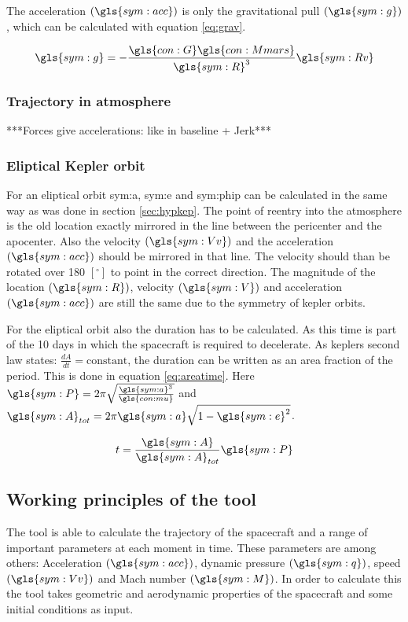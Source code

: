 The acceleration $\left(\gls{sym:acc}\right)$ is only the gravitational pull $\left(\gls{sym:g}\right)$, which can be calculated with equation \ref{eq:grav}.

\begin{equation} \label{eq:grav}
\gls{sym:g} = -\frac{\gls{con:G}\gls{con:Mmars}}
					{\gls{sym:R}^3}\gls{sym:Rv}
\end{equation}

\subsubsection{Trajectory in atmosphere}
 \label{sec:trajatmos}
***Forces give accelerations: like in baseline + Jerk***\\

\subsubsection{Eliptical Kepler orbit}
 \label{sec:eliptickep}
For an eliptical orbit \gls{sym:a}, \gls{sym:e} and \gls{sym:phip} can be calculated in the same way as was done in section \ref{sec:hypkep}. The point of reentry into the atmosphere is the old location exactly mirrored in the line between the pericenter and the apocenter. Also the velocity $\left(\gls{sym:Vv}\right)$ and the acceleration $\left(\gls{sym:acc}\right)$  should be mirrored in that line. The velocity should than be rotated over 180 $\left[^\circ\right]$ to point in the correct direction. The magnitude of the location $\left(\gls{sym:R}\right)$, velocity $\left(\gls{sym:V}\right)$ and acceleration $\left(\gls{sym:acc}\right)$ are still the same due to the symmetry of kepler orbits.

For the eliptical orbit also the duration has to be calculated. As this time is part of the 10 days in which the spacecraft is required to decelerate. As keplers second law states: $\frac{dA}{dt}=\mbox{constant}$, the duration can be written as an area fraction of the period. This is done in equation \ref{eq:areatime}. Here $\gls{sym:P} = 2\pi\sqrt{\frac{\gls{sym:a}^3}{\gls{con:mu}}}$ and $\gls{sym:A}_{tot} = 2\pi \gls{sym:a} \sqrt{1-\gls{sym:e}^2}$.

\begin{equation}
t = \frac{\gls{sym:A}}{\gls{sym:A}_{tot}}\gls{sym:P}
\label{eq:areatime}
\end{equation}

\subsection{Working principles of the tool}
\label{sec:astrowp}
The tool is able to calculate the trajectory of the spacecraft and a range of important parameters at each moment in time. These parameters are among others: Acceleration $\left(\gls{sym:acc}\right)$, dynamic pressure $\left(\gls{sym:q}\right)$, speed $\left(\gls{sym:Vv}\right)$ and Mach number $\left(\gls{sym:M}\right)$. In order to calculate this the tool takes geometric and aerodynamic properties of the spacecraft and some initial conditions as input.

